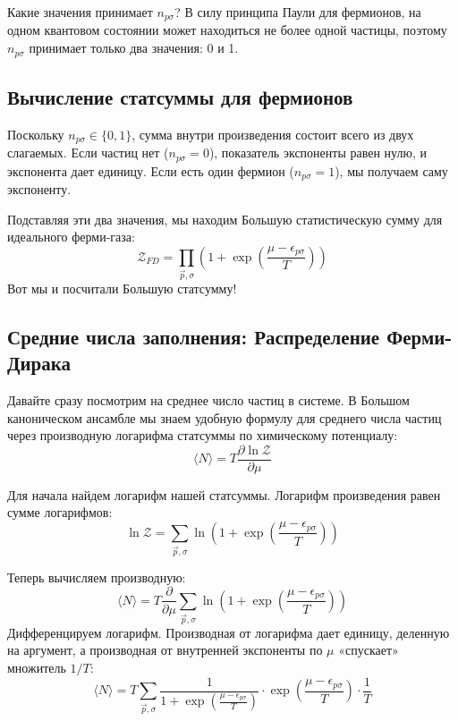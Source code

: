 \documentclass[../general/general]{subfiles}
\begin{document}
Какие значения принимает $n_{p\sigma}$? В силу принципа Паули для фермионов, на одном квантовом состоянии может находиться не более одной частицы, поэтому $n_{p\sigma}$ принимает только два значения: 0 и 1.

\subsection{Вычисление статсуммы для фермионов}

Поскольку $n_{p\sigma} \in \{0, 1\}$, сумма внутри произведения состоит всего из двух слагаемых. 
Если частиц нет ($n_{p\sigma}=0$), показатель экспоненты равен нулю, и экспонента дает единицу. Если есть один фермион ($n_{p\sigma}=1$), мы получаем саму экспоненту.

Подставляя эти два значения, мы находим Большую статистическую сумму для идеального ферми-газа:
\begin{equation}
    \mathcal{Z}_{FD} = \prod_{\vec{p}, \sigma} \left( 1 + \exp\left( \frac{\mu - \epsilon_{p\sigma}}{T} \right) \right)
\end{equation}
Вот мы и посчитали Большую статсумму!

\subsection{Средние числа заполнения: Распределение Ферми-Дирака}

Давайте сразу посмотрим на среднее число частиц в системе. В Большом каноническом ансамбле мы знаем удобную формулу для среднего числа частиц через производную логарифма статсуммы по химическому потенциалу:
\begin{equation}
    \langle N \rangle = T \frac{\partial \ln \mathcal{Z}}{\partial \mu}
\end{equation}

Для начала найдем логарифм нашей статсуммы. Логарифм произведения равен сумме логарифмов:
\begin{equation}
    \ln \mathcal{Z} = \sum_{\vec{p}, \sigma} \ln\left( 1 + \exp\left( \frac{\mu - \epsilon_{p\sigma}}{T} \right) \right)
\end{equation}

Теперь вычисляем производную:
\begin{equation}
    \langle N \rangle = T \frac{\partial}{\partial \mu} \sum_{\vec{p}, \sigma} \ln\left( 1 + \exp\left( \frac{\mu - \epsilon_{p\sigma}}{T} \right) \right)
\end{equation}
Дифференцируем логарифм. Производная от логарифма дает единицу, деленную на аргумент, а производная от внутренней экспоненты по $\mu$ «спускает» множитель $1/T$:
\begin{equation}
    \langle N \rangle = T \sum_{\vec{p}, \sigma} \frac{1}{1 + \exp\left( \frac{\mu - \epsilon_{p\sigma}}{T} \right)} \cdot \exp\left( \frac{\mu - \epsilon_{p\sigma}}{T} \right) \cdot \frac{1}{T}
\end{equation}
\end{document}
